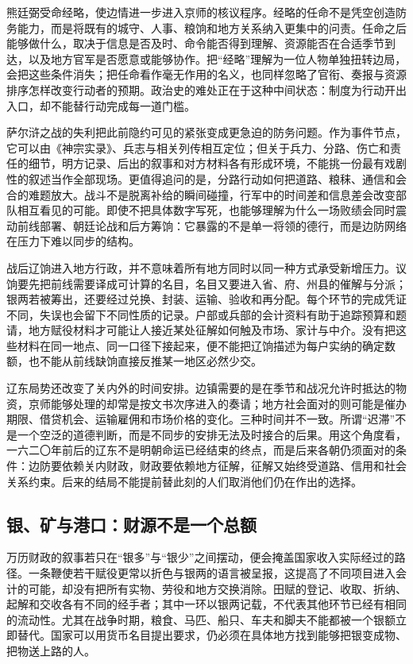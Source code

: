 熊廷弼受命经略，使边情进一步进入京师的核议程序。经略的任命不是凭空创造防务能力，而是将既有的城守、人事、粮饷和地方关系纳入更集中的问责。任命之后能够做什么，取决于信息是否及时、命令能否得到理解、资源能否在合适季节到达，以及地方官军是否愿意或能够协作。把“经略”理解为一位人物单独扭转边局，会把这些条件消失；把任命看作毫无作用的名义，也同样忽略了官衔、奏报与资源排序怎样改变行动者的预期。政治史的难处正在于这种中间状态：制度为行动开出入口，却不能替行动完成每一道门槛。

萨尔浒之战的失利把此前隐约可见的紧张变成更急迫的防务问题。作为事件节点，它可以由《神宗实录》、兵志与相关列传相互定位；但关于兵力、分路、伤亡和责任的细节，明方记录、后出的叙事和对方材料各有形成环境，不能挑一份最有戏剧性的叙述当作全部现场。更值得追问的是，分路行动如何把道路、粮秣、通信和会合的难题放大。战斗不是脱离补给的瞬间碰撞，行军中的时间差和信息差会改变部队相互看见的可能。即使不把具体数字写死，也能够理解为什么一场败绩会同时震动前线部署、朝廷论战和后方筹饷：它暴露的不是单一将领的德行，而是边防网络在压力下难以同步的结构。

战后辽饷进入地方行政，并不意味着所有地方同时以同一种方式承受新增压力。议饷要先把前线需要译成可计算的名目，名目又要进入省、府、州县的催解与分派；银两若被筹出，还要经过兑换、封装、运输、验收和再分配。每个环节的完成凭证不同，失误也会留下不同性质的记录。户部或兵部的会计资料有助于追踪预算和题请，地方赋役材料才可能让人接近某处征解如何触及市场、家计与中介。没有把这些材料在同一地点、同一口径下接起来，便不能把辽饷描述为每户实纳的确定数额，也不能从前线缺饷直接反推某一地区必然少交。

辽东局势还改变了关内外的时间安排。边镇需要的是在季节和战况允许时抵达的物资，京师能够处理的却常是按文书次序进入的奏请；地方社会面对的则可能是催办期限、借贷机会、运输雇佣和市场价格的变化。三种时间并不一致。所谓“迟滞”不是一个空泛的道德判断，而是不同步的安排无法及时接合的后果。用这个角度看，一六二〇年前后的辽东不是明朝命运已经结束的终点，而是后来各朝仍须面对的条件：边防要依赖关内财政，财政要依赖地方征解，征解又始终受道路、信用和社会关系约束。后来的结局不能提前替此刻的人们取消他们仍在作出的选择。

\subsection{银、矿与港口：财源不是一个总额}

万历财政的叙事若只在“银多”与“银少”之间摆动，便会掩盖国家收入实际经过的路径。一条鞭使若干赋役更常以折色与银两的语言被呈报，这提高了不同项目进入会计的可能，却没有把所有实物、劳役和地方交换消除。田赋的登记、收取、折纳、起解和交收各有不同的经手者；其中一环以银两记载，不代表其他环节已经有相同的流动性。尤其在战争时期，粮食、马匹、船只、车夫和脚夫不能都被一个银额立即替代。国家可以用货币名目提出要求，仍必须在具体地方找到能够把银变成物、把物送上路的人。

